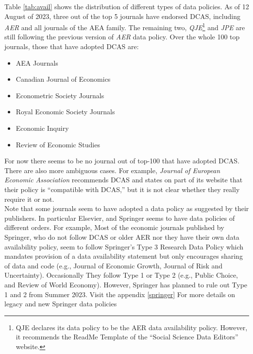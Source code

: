\documentclass[11pt]{article}
\begin{document}
Table \ref{tab:avail} shows the distribution of different types of data policies. As of 12 August of 2023, three out of the top 5 journals have endorsed DCAS, including \textit{AER} and all journals of the AEA family. The remaining two, \textit{QJE}\footnote{QJE declares its data policy to be the AER data availability policy. However, it recommends the ReadMe Template of the ``Social Science Data Editors'' website.} and \textit{JPE} are still following the previous version of \textit{AER} data policy. Over the whole 100 top journals, those that have adopted DCAS are:
\begin{itemize}
\item AEA Journals
\item Canadian Journal of Economics
\item Econometric Society Journals
\item Royal Economic Society Journals
\item Economic Inquiry
\item Review of Economic Studies
\end{itemize}

For now there seems to be no journal out of top-100 that have adopted DCAS. There are also more ambiguous cases. For example, \textit{Journal of European Economic Association} recommends DCAS and states on part of its website that their policy is ``compatible with DCAS,'' but it is not clear whether they really require it or not.\\

Note that some journals seem to have adopted a data policy as suggested by their publishers. In particular Elsevier, and Springer seems to have data policies of different orders. For example, Most of the economic journals published by Springer, who do not follow DCAS or older AER nor they have their own data availability policy, seem to follow Springer's Type 3 Research Data Policy which mandates provision of a data availability statement but only encourages sharing of data and code (e.g., Journal of Economic Growth, Journal of Risk and Uncertainty). Occasionally They follow Type 1 or Type 2 (e.g., Public Choice, and Review of World Economy). However, Springer has planned to rule out Type 1 and 2 from Summer 2023. Visit the appendix \ref{springer} For more details on legacy and new Springer data policies\\
\end{document}
